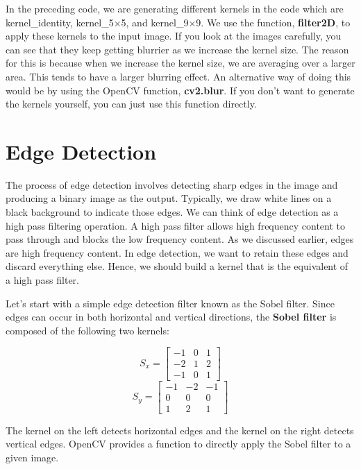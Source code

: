 In the preceding code, we are generating different kernels in the code which are kernel\_identity, kernel\_5$\times$5, and kernel\_9$\times$9. We use the function, \textbf{filter2D}, to apply these kernels to the input image. If you look at the images carefully, you can see that they keep getting blurrier as we increase the kernel size. The reason for this is because when we increase the kernel size, we are averaging over a larger area. This tends to have a larger blurring effect. An alternative way of doing this would be by using the OpenCV function, \textbf{cv2.blur}. If you don't want to generate the kernels yourself, you can just use this function directly.

\section{Edge Detection}
The process of edge detection involves detecting sharp edges in the image and producing a binary image as the output. Typically, we draw white lines on a black background to indicate those edges. We can think of edge detection as a high pass filtering operation. A high pass filter allows high frequency content to pass through and blocks the low frequency content. As we discussed earlier, edges are high frequency content. In edge detection, we want to retain these edges and discard everything else. Hence, we should build a kernel that is the equivalent of a high pass filter.

Let's start with a simple edge detection filter known as the Sobel filter. Since edges can occur in both horizontal and vertical directions, the \textbf{Sobel filter} is composed of the following two kernels:

\begin{center}
	\[
	\textit{$S_x$} =  
	\begin{bmatrix}
		-1 & 0 & 1 \\
		-2 & 1 & 2 \\
		-1 & 0 & 1
	\end{bmatrix}
	\]
	\hspace{2cm}
	\[
	\textit{$S_y$} =  
	\begin{bmatrix}
		-1 & -2 & -1 \\
		0 & 0 & 0 \\
		1 & 2 & 1
	\end{bmatrix}
	\]
\end{center}

The kernel on the left detects horizontal edges and the kernel on the right detects vertical edges. OpenCV provides a function to directly apply the Sobel filter to a given image.

